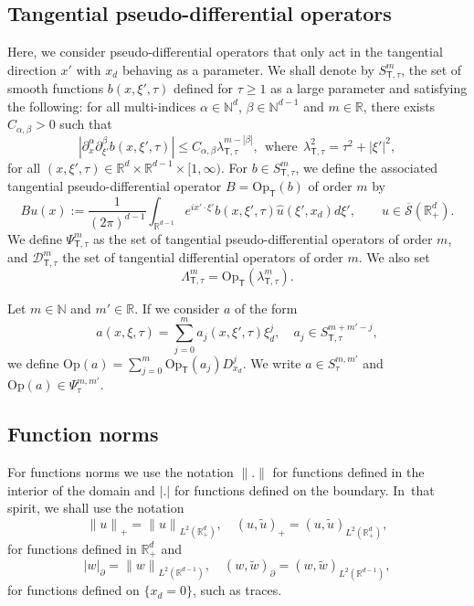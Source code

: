 \documentclass[JEP,XML,SOM,Unicode,published]{cedram}
\theoremstyle{plain}
\theoremstyle{definition}
\def\R{\mathbb{R}}
\def\N{\mathbb{N}}
\newcommand{\inp}[2]{(#1, #2)}
\newcommand{\Op}{\ensuremath{\mathrm{Op}}}
\newcommand{\Opt}{\ensuremath{\mathrm{Op}_{\scriptscriptstyle{\mathsf{T}}}}}
\newcommand{\Norm}[2]{{\| #1 \|}_{#2}}
\newcommand{\norm}[2]{{|#1|}_{#2}}
\newcommand{\lsct}{\lambda_{{\scriptscriptstyle{\mathsf T}},\tau}}
\newcommand{\Lsct}{\Lambda_{{\scriptscriptstyle{\mathsf T}},\tau}}
\newcommand{\Ssc}{S_\tau}
\newcommand{\Psisc}{\Psi_\tau}
\newcommand{\Ssct}{S_{{\scriptscriptstyle{\mathsf T}},\tau}}
\newcommand{\Psisct}{\Psi_{{\scriptscriptstyle{\mathsf T}},\tau}}
\newcommand{\Dsct}{\mathscr{D}_{{\scriptscriptstyle{\mathsf T}},\tau}}
\newcommand{\Sbarp}{\ensuremath{\overline{\mathscr{S}}(\Rdp)}}
\newcommand{\Rdp}{\R^d_+}
\begin{document}
\subsection{Tangential pseudo-differential operators}\label{ss2}
Here, we consider pseudo-diffe\-ren\-tial operators that only act in the
tangential direction $x'$ with $x_d$ behaving as a parameter. We shall
denote by $\Ssct^m$, the set of smooth functions $b(x,\xi',\tau)$
defined for $\tau\geq 1$ as a large parameter and satisfying the
following: for all multi-indices $\alpha\in\N^d$,
$\beta\in\N^{d-1}$ and $m\in\R$, there exists
$C_{\alpha,\beta}>0$ such
that
\begin{equation*}
|\partial_x^{\alpha}\partial^{\beta}_{\xi'}b(x,\xi',\tau)|\leq
C_{\alpha,\beta}\lsct^{m-|\beta|}, \ \
\text{where} \ \ \lsct^2=\tau^2+|\xi'|^2,
\end{equation*}
for all
$(x,\xi',\tau)\in\R^d\times\R^{d-1}\times [1, \infty)$. For $b\in \Ssct^m$,
we define the associated tangential pseudo-differential operator
$B=\Opt (b)$ of order $m$ by
\begin{equation*}
Bu(x):=\frac{1}{(2\pi)^{d-1}}
\int_{\R^{d-1}}e^{i x'\cdot \xi'}b(x,\xi',\tau)\hat{u}(\xi',x_d)d{\xi'},
\qquad u\in\Sbarp.
\end{equation*}
We define $\Psisct^m$ as the set of tangential
pseudo-differential operators of order $m$, and
$\Dsct^m$ the set of tangential differential
operators of order $m$. We also set
\begin{equation*}
\Lsct^m=\Opt (\lsct^m).
\end{equation*}

Let $m\in\N$ and $m'\in\R$. If we consider $a$ of the form
\begin{equation*}
a(x,\xi,\tau)=\sum_{j=0}^{m}a_j(x,\xi',\tau)\xi_d^j,
\quad a_j\in \Ssct^{m+m'-j},
\end{equation*}
we define $\Op (a)=\sum_{j=0}^{m}\Opt (a_j)D^j_{x_d}$. We
write $a\in \Ssc^{m,m'}$ and $\Op (a)\in \Psisc^{m,m'}$.

\subsection{Function norms}
\label{sec: Function norms}
For functions norms we use the notation $\|.\|$ for functions
defined in the interior of the domain and $|.|$ for functions defined on the boundary.
In~that spirit, we shall use the notation
\begin{equation*}
\Norm{u}{+}=\Norm{u}{L^2(\Rdp)}, \quad
\inp{u}{\tilde{u}}_+=\inp{u}{\tilde{u}}_{L^2(\Rdp)},
\end{equation*}
for functions defined in $\Rdp$ and
\begin{equation*}
\norm{w}{\partial}=\Norm{w}{L^2(\R^{d-1})}, \quad
\inp{w}{\tilde{w}}_{\partial}=\inp{w}{\tilde{w}}_{L^2(\R^{d-1})},
\end{equation*}
for functions defined on $\{ x_d =0\}$, such as traces.
\end{document}
